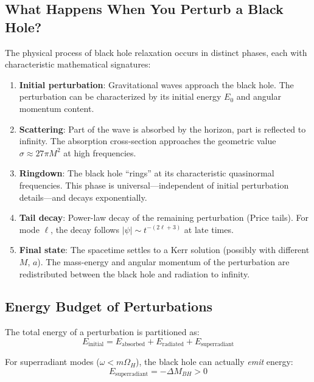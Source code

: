\documentclass[12pt,a4paper]{article}
\begin{document}
\subsection{What Happens When You Perturb a Black Hole?}

The physical process of black hole relaxation occurs in distinct phases, each with characteristic mathematical signatures:

\begin{enumerate}
    \item \textbf{Initial perturbation}: Gravitational waves approach the black hole. The perturbation can be characterized by its initial energy $E_0$ and angular momentum content.
    
    \item \textbf{Scattering}: Part of the wave is absorbed by the horizon, part is reflected to infinity. The absorption cross-section approaches the geometric value $\sigma \approx 27\pi M^2$ at high frequencies.
    
    \item \textbf{Ringdown}: The black hole ``rings'' at its characteristic quasinormal frequencies. This phase is universal---independent of initial perturbation details---and decays exponentially.
    
    \item \textbf{Tail decay}: Power-law decay of the remaining perturbation (Price tails). For mode $\ell$, the decay follows $|\psi| \sim t^{-(2\ell+3)}$ at late times.
    
    \item \textbf{Final state}: The spacetime settles to a Kerr solution (possibly with different $M$, $a$). The mass-energy and angular momentum of the perturbation are redistributed between the black hole and radiation to infinity.
\end{enumerate}

\subsection{Energy Budget of Perturbations}

The total energy of a perturbation is partitioned as:
\begin{equation}
E_{\text{initial}} = E_{\text{absorbed}} + E_{\text{radiated}} + E_{\text{superradiant}}
\end{equation}

For superradiant modes ($\omega < m\Omega_H$), the black hole can actually \textit{emit} energy:
\begin{equation}
E_{\text{superradiant}} = -\Delta M_{BH} > 0
\end{equation}
\end{document}

